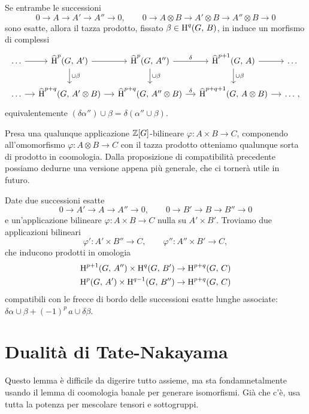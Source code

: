 \begin{proposition}
	Se entrambe le successioni
	\[ 0 \to A \to A' \to A'' \to 0, \qquad 0 \to A \otimes B \to A'\otimes B \to A''\otimes B \to 0 \]
	sono esatte, allora il tazza prodotto, fissato $ \beta \in \operatorname{H}^q(G, \, B) $, in induce un morfismo di complessi
	\[\begin{tikzcd}[column sep = small]
	\dots \rar
	& \Hh^{p}(G, \, A') \dar["\cup\beta"] \rar 
	& \Hh^{p}(G, \, A'') \rar["\delta"] \dar["\cup\beta"]
	& \Hh^{p+1}(G, \, A) \rar \dar["\cup\beta"]
	&\dots  \\
	\dots \rar
	& \Hh^{p+q}(G, \, A'\otimes B) \rar
	& \Hh^{p+q}(G, \, A''\otimes B) \rar["\delta"]
	& \Hh^{p+q+1}(G, \, A\otimes B) \rar &\dots \, , \end{tikzcd}\]
	equivalentemente $ (\delta\alpha'') \cup \beta = \delta (\alpha'' \cup \beta) $.
\end{proposition}

Presa una qualunque applicazione $ \mathbb{Z}[G] $-bilineare $ \varphi\colon A \times B \to C $, componendo all'omomorfismo $ \varphi\colon A \otimes B \to C  $ con il tazza prodotto otteniamo qualunque sorta di prodotto in coomologia. Dalla proposizione di compatibilità precedente possiamo dedurne una versione appena più generale, che ci tornerà utile in futuro.

\begin{lemma}
	Date due successioni esatte
	\[ 0 \to A' \to A \to A'' \to 0, \qquad 0 \to B' \to B \to B'' \to 0 \]
	e un'applicazione bilineare $  \varphi\colon A \times B \to C $ nulla su $ A'\times B' $. Troviamo due applicazioni bilineari
	\[ \varphi'\colon A' \times B'' \to C, \qquad \varphi''\colon A'' \times B' \to C, \]
	che inducono prodotti in omologia
	\begin{align*}
		\operatorname{H}^{p+1}(G, \, A'') \times \operatorname{H}^{q}(G, \, B') &\to \operatorname{H}^{p+q}(G, \, C)\\
		\operatorname{H}^{p}(G, \, A') \times \operatorname{H}^{q-1}(G, \, B'') &\to \operatorname{H}^{p+q}(G, \, C)
	\end{align*}
	compatibili con le frecce di bordo delle successioni esatte lunghe associate:  $ \delta \alpha \cup \beta + (-1)^p \, a \cup \delta \beta $.
\end{lemma}

\section{Dualità di Tate-Nakayama}

Questo lemma è difficile da digerire tutto assieme, ma sta fondamnetalmente usando il lemma di coomologia banale per generare isomorfismi. Già che c'è, usa tutta la potenza per mescolare tensori e sottogruppi.

